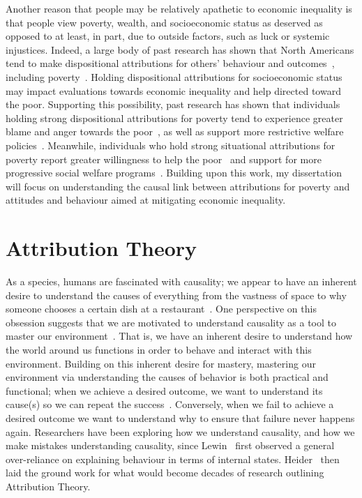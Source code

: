 \documentclass{sfuthesis}
\begin{document}
Another reason that people may be relatively apathetic to economic inequality is that people view poverty, wealth, and socioeconomic status as deserved as opposed to at least, in part, due to outside factors, such as luck or systemic injustices. Indeed, a large body of past research has shown that North Americans tend to make dispositional attributions for others’ behaviour and outcomes~\cite{miller84, morris94}, including poverty~\cite{bullock95, cozzarelli01, feather74, halpern93}. Holding dispositional attributions for socioeconomic status may impact evaluations towards economic inequality and help directed toward the poor. Supporting this possibility, past research has shown that individuals holding strong dispositional attributions for poverty tend to experience greater blame and anger towards the poor~\cite{cozzarelli01, zucker93}, as well as support more restrictive welfare policies~\cite{bullock03}. Meanwhile, individuals who hold strong situational attributions for poverty report greater willingness to help the poor~\cite{bullock03} and support for more progressive social welfare programs~\cite{kluegel86}. Building upon this work, my dissertation will focus on understanding the causal link between attributions for poverty and attitudes and behaviour aimed at mitigating economic inequality. 

\section{Attribution Theory}

As a species, humans are fascinated with causality; we appear to have an inherent desire to understand the causes of everything from the vastness of space to why someone chooses a certain dish at a restaurant~\cite{ariely00, weiner85}. One perspective on this obsession suggests that we are motivated to understand causality as a tool to master our environment~\cite{white59}. That is, we have an inherent desire to understand how the world around us functions in order to behave and interact with this environment. Building on this inherent desire for mastery, mastering our environment via understanding the causes of behavior is both practical and functional; when we achieve a desired outcome, we want to understand its cause(s) so we can repeat the success~\cite{kelley73}. Conversely, when we fail to achieve a desired outcome we want to understand why to ensure that failure never happens again. Researchers have been exploring how we understand causality, and how we make mistakes understanding causality, since Lewin~\cite{lewin35} first observed a general over-reliance on explaining behaviour in terms of internal states. Heider~\cite{heider58} then laid the ground work for what would become decades of research outlining Attribution Theory.
\end{document}
